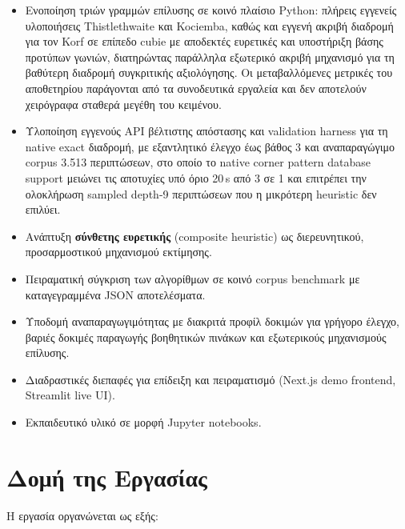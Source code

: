 \begin{itemize}
    \item Ενοποίηση τριών γραμμών επίλυσης σε κοινό πλαίσιο Python: πλήρεις εγγενείς υλοποιήσεις Thistlethwaite και Kociemba, καθώς και εγγενή ακριβή διαδρομή για τον Korf σε επίπεδο cubie με αποδεκτές ευρετικές και υποστήριξη βάσης προτύπων γωνιών, διατηρώντας παράλληλα εξωτερικό ακριβή μηχανισμό για τη βαθύτερη διαδρομή συγκριτικής αξιολόγησης. Οι μεταβαλλόμενες μετρικές του αποθετηρίου παράγονται από τα συνοδευτικά εργαλεία και δεν αποτελούν χειρόγραφα σταθερά μεγέθη του κειμένου.

    \item Υλοποίηση εγγενούς API βέλτιστης απόστασης και validation harness για τη native exact διαδρομή, με εξαντλητικό έλεγχο έως βάθος 3 και αναπαραγώγιμο corpus 3.513 περιπτώσεων, στο οποίο το native corner pattern database support μειώνει τις αποτυχίες υπό όριο 20\,s από 3 σε 1 και επιτρέπει την ολοκλήρωση sampled depth-9 περιπτώσεων που η μικρότερη heuristic δεν επιλύει.

    \item Ανάπτυξη \textbf{σύνθετης ευρετικής} (composite heuristic) ως διερευνητικού, προσαρμοστικού μηχανισμού εκτίμησης.

    \item Πειραματική σύγκριση των αλγορίθμων σε κοινό corpus benchmark με καταγεγραμμένα JSON αποτελέσματα.

    \item Υποδομή αναπαραγωγιμότητας με διακριτά προφίλ δοκιμών για γρήγορο έλεγχο, βαριές δοκιμές παραγωγής βοηθητικών πινάκων και εξωτερικούς μηχανισμούς επίλυσης.

    \item Διαδραστικές διεπαφές για επίδειξη και πειραματισμό (Next.js demo frontend, Streamlit live UI).

    \item Εκπαιδευτικό υλικό σε μορφή Jupyter notebooks.
\end{itemize}


\section{Δομή της Εργασίας}
\label{sec:intro_structure}

Η εργασία οργανώνεται ως εξής:

